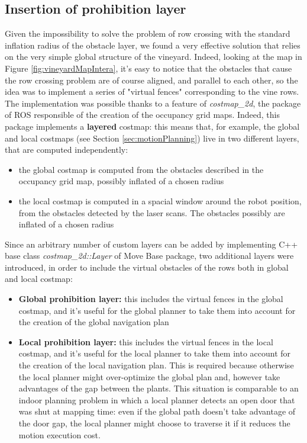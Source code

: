 \subsection{Insertion of prohibition layer}\label{subsec:virtualFences}
Given the impossibility to solve the problem of row crossing with the standard inflation radius of the obstacle layer, we found a very effective solution that relies on the very simple global structure of the vineyard. Indeed, looking at the map in Figure \ref{fig:vineyardMapIntera}, it's easy to notice that the obstacles that cause the row crossing problem are of course aligned, and parallel to each other, so the idea was to implement a series of "virtual fences" corresponding to the vine rows. The implementation was possible thanks to a feature of \textit{costmap\_2d}, the package of \ac{ROS} responsible of the creation of the occupancy grid maps. Indeed, this package implements a \textbf{layered} costmap: this means that, for example, the global and local costmaps (see Section \ref{sec:motionPlanning}) live in two different layers, that are computed independently:
\begin{itemize}
	\item the global costmap is computed from the obstacles described in the occupancy grid map, possibly inflated of a chosen radius
	\item the local costmap is computed in a spacial window around the robot position, from the obstacles detected by the laser scans. The obstacles possibly are inflated of a chosen radius
\end{itemize}
Since an arbitrary number of custom layers can be added by implementing C++ base class \textit{costmap\_2d::Layer} of Move Base package, two additional layers were introduced, in order to include the virtual obstacles of the rows both in global and local costmap:
\begin{itemize}
	\item \textbf{Global prohibition layer:} this includes the virtual fences in the global costmap, and it's useful for the global planner to take them into account for the creation of the global navigation plan
	\item \textbf{Local prohibition layer:} this includes the virtual fences in the local costmap, and it's useful for the local planner to take them into account for the creation of the local navigation plan. This is required because otherwise the local planner might over-optimize the global plan and, however take advantages of the gap between the plants. This situation is comparable to an indoor planning problem in which a local planner detects an open door that was shut at mapping time: even if the global path doesn't take advantage of the door gap, the local planner might choose to traverse it if it reduces the motion execution cost.
\end{itemize}

